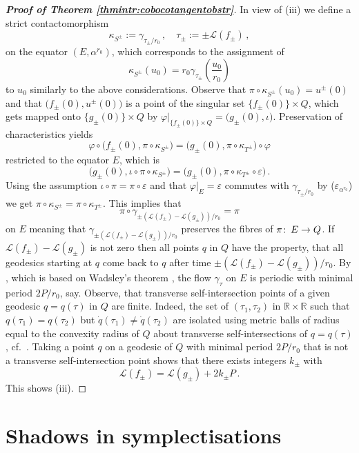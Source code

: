 \documentclass{amsart}
\theoremstyle{definition}
\def\co{\colon\thinspace}
\newcommand{\LLL}{\mathscr L}
\newcommand{\R}{\mathbb R}
\newcommand{\ra}{\rightarrow}
\begin{document}
\begin{proof}[{\bf Proof of Theorem \ref{thmintr:cobocotangentobstr}}]
In view of (iii) we define
a strict contactomorphism
\[
\kappa_{S^{\pm}}:=
\gamma_{\tau_{\pm}/r_0}
\,,
\quad
\tau_{\pm}:={\pm}\LLL(f_{\pm})
\,,
\]
on the equator $(E,\alpha^{r_0})$,
which corresponds to the assignment of
\[
\kappa_{S^{\pm}}(u_0)=
r_0\gamma_{\tau_{\pm}}
\!\left(\frac{u_0}{r_0}\right)
\]
to $u_0$ similarly to the above considerations.
Observe that
$\pi\circ\kappa_{S^{\pm}}(u_0)=u^{\pm}(0)$
and that $\big(f_{\pm}(0),u^{\pm}(0)\big)$
is a point of the singular set $\{f_{\pm}(0)\}\times Q$,
which gets mapped onto $\{g_{\pm}(0)\}\times Q$ by
$\varphi|_{\{f_{\pm}(0)\}\times Q}=\big(g_{\pm}(0),\iota\big)$.
Preservation of characteristics yields
\[
\varphi\circ
\big(f_{\pm}(0),\pi\circ\kappa_{S^{\pm}}\big)
=
\big(g_{\pm}(0),\pi\circ\kappa_{T^{\pm}}\big)
\circ\varphi
\]
restricted to the equator $E$,
which is
\[
\Big(g_{\pm}(0),\iota\circ\pi\circ\kappa_{S^{\pm}}\Big)
=
\Big(g_{\pm}(0),\pi\circ\kappa_{T^{\pm}}\circ\varepsilon\Big)
\,.
\]
Using the assumption $\iota\circ\pi=\pi\circ\varepsilon$
and that $\varphi|_E=\varepsilon$ commutes with
$\gamma_{\tau_{\pm}/r_0}$ by ($\varepsilon_{\alpha^{r_0}}$)
we get
$\pi\circ\kappa_{S^{\pm}}=\pi\circ\kappa_{T^{\pm}}$.
This implies that
\[
\pi\circ\gamma_{\pm(\LLL(f_{\pm})-\LLL(g_{\pm}))/r_0}
=\pi
\]
on $E$ meaning that
$\gamma_{\pm(\LLL(f_{\pm})-\LLL(g_{\pm}))/r_0}$
preserves the fibres of $\pi\co E\ra Q$.
If $\LLL(f_{\pm})-\LLL(g_{\pm})$ is not zero
then all points $q$ in $Q$ have the property,
that all geodesics starting at $q$ come back to $q$
after time $\pm(\LLL(f_{\pm})-\LLL(g_{\pm}))/r_0$.
By \cite[Proposition 7.9(b)]{bes78},
which is based on Wadsley's theorem \cite{wad75},
the flow $\gamma_{\tau}$ on $E$ is periodic
with minimal period $2P/r_0$, say.
Observe,
that transverse self-intersection points
of a given geodesic $q=q(\tau)$ in $Q$ are finite.
Indeed,
the set of $(\tau_1,\tau_2)$ in $\R\times\R$
such that $q(\tau_1)=q(\tau_2)$
but $\dot q(\tau_1)\neq\dot q(\tau_2)$ are isolated
using metric balls of radius equal to the convexity radius of $Q$
about transverse self-intersections of $q=q(\tau)$,
cf.\ \cite[Lemma 7.10]{bes78}.
Taking a point $q$ on a geodesic of $Q$
with minimal period $2P/r_0$
that is not a transverse self-intersection point
shows that there exists integers $k_{\pm}$ with
  \[
  \LLL(f_{\pm})=\LLL(g_{\pm})+2k_{\pm}P
  \,.
  \]
This shows (iii).
\end{proof}




\section{Shadows in symplectisations\label{sec:shadowsympl}}
\end{document}

